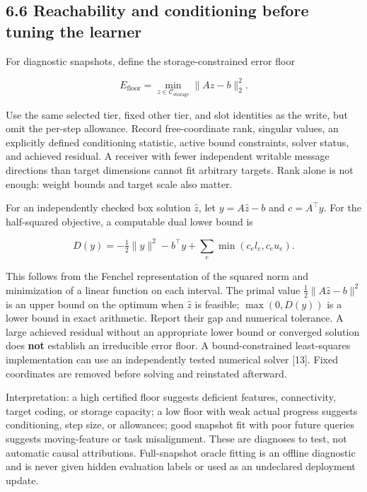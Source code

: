 \documentclass[
  11pt,
  a4paper,
]{article}
\begin{document}
\subsection{6.6 Reachability and conditioning before tuning the
learner}\label{reachability-and-conditioning-before-tuning-the-learner}

For diagnostic snapshots, define the storage-constrained error floor

\[
E_{\mathrm{floor}}=\min_{z\in\mathcal C_{\mathrm{storage}}}\|Az-b\|_2^2.
\]

Use the same selected tier, fixed other tier, and slot identities as the
write, but omit the per-step allowance. Record free-coordinate rank,
singular values, an explicitly defined conditioning statistic, active
bound constraints, solver status, and achieved residual. A receiver with
fewer independent writable message directions than target dimensions
cannot fit arbitrary targets. Rank alone is not enough: weight bounds
and target scale also matter.

For an independently checked box solution \(\widehat z\), let
\(y=A\widehat z-b\) and \(c=A^\top y\). For the half-squared objective,
a computable dual lower bound is

\[
D(y)=-\tfrac12\|y\|^2-b^\top y+
\sum_e\min(c_el_e,c_eu_e).
\]

This follows from the Fenchel representation of the squared norm and
minimization of a linear function on each interval. The primal value
\(\tfrac12\|A\widehat z-b\|^2\) is an upper bound on the optimum when
\(\widehat z\) is feasible; \(\max(0,D(y))\) is a lower bound in exact
arithmetic. Report their gap and numerical tolerance. A large achieved
residual without an appropriate lower bound or converged solution does
\textbf{not} establish an irreducible error floor. A bound-constrained
least-squares implementation can use an independently tested numerical
solver {[}13{]}. Fixed coordinates are removed before solving and
reinstated afterward.

Interpretation: a high certified floor suggests deficient features,
connectivity, target coding, or storage capacity; a low floor with weak
actual progress suggests conditioning, step size, or allowances; good
snapshot fit with poor future queries suggests moving-feature or task
misalignment. These are diagnoses to test, not automatic causal
attributions. Full-snapshot oracle fitting is an offline diagnostic and
is never given hidden evaluation labels or used as an undeclared
deployment update.
\end{document}
